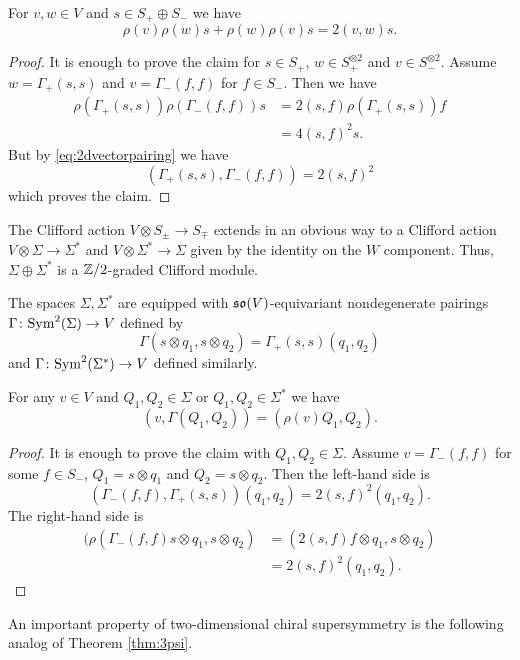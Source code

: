 \documentclass[10pt, oneside]{article}
\begin{document}
\begin{prop}
For $v,w\in V$ and $s\in S_+\oplus S_-$ we have
\[\rho(v)\rho(w)s + \rho(w)\rho(v) s = 2(v, w) s.\]
\end{prop}
\begin{proof}
It is enough to prove the claim for $s\in S_+$, $w\in S_+^{\otimes 2}$ and $v\in S_-^{\otimes 2}$. Assume $w=\Gamma_+(s, s)$ and $v = \Gamma_-(f, f)$ for $f\in S_-$. Then we have
\begin{align*}
\rho(\Gamma_+(s, s)) \rho(\Gamma_-(f, f)) s &= 2(s, f) \rho(\Gamma_+(s, s)) f \\
&= 4(s, f)^2 s.
\end{align*}
But by \eqref{eq:2dvectorpairing} we have
\[(\Gamma_+(s, s), \Gamma_-(f, f)) = 2(s, f)^2\]
which proves the claim.
\end{proof}

The Clifford action $V\otimes S_{\pm}\rightarrow S_{\mp}$ extends in an obvious way to a Clifford action $V\otimes \Sigma\rightarrow \Sigma^*$ and $V\otimes \Sigma^*\rightarrow \Sigma$ given by the identity on the $W$ component. Thus, $\Sigma\oplus \Sigma^*$ is a $\mathbb Z/2$-graded Clifford module.

The spaces $\Sigma, \Sigma^*$ are equipped with $\mathfrak{so}(V)$-equivariant nondegenerate pairings $\Gamma\colon {\rm Sym}^2(\Sigma)\rightarrow V$ defined by
\[\Gamma(s\otimes q_1, s\otimes q_2) = \Gamma_+(s, s) (q_1, q_2)\]
and $\Gamma\colon {\rm Sym}^2(\Sigma^*)\rightarrow V$ defined similarly.

\begin{prop}
For any $v\in V$ and $Q_1, Q_2\in\Sigma$ or $Q_1, Q_2\in\Sigma^*$ we have
\[(v, \Gamma(Q_1, Q_2)) = (\rho(v) Q_1, Q_2).\]
\end{prop}
\begin{proof}
It is enough to prove the claim with $Q_1, Q_2\in\Sigma$. Assume $v = \Gamma_-(f, f)$ for some $f\in S_-$, $Q_1 = s\otimes q_1$ and $Q_2 = s\otimes q_2$. Then the left-hand side is
\[(\Gamma_-(f, f), \Gamma_+(s, s)) (q_1, q_2) = 2(s, f)^2 (q_1, q_2).\]
The right-hand side is
\begin{align*}
(\rho(\Gamma_-(f, f) s\otimes q_1, s\otimes q_2) &= (2(s, f) f\otimes q_1, s\otimes q_2) \\
&= 2(s, f)^2 (q_1, q_2).
\end{align*}
\end{proof}

An important property of two-dimensional chiral supersymmetry is the following analog of Theorem \ref{thm:3psi}.
\end{document}
